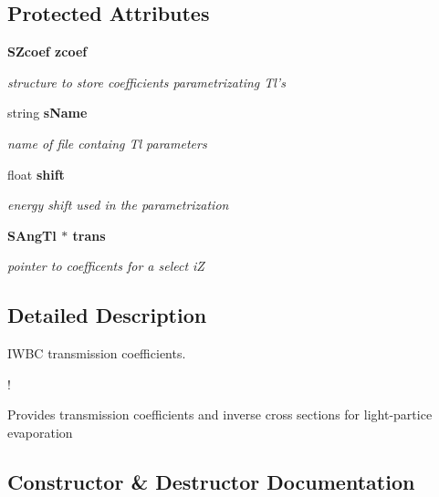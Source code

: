 \subsection*{Protected Attributes}
\begin{CompactItemize}
\item 
\bf{SZcoef} \bf{zcoef}\label{classCTlArray_5028ad63ebf842107ed442c414510abc}

\begin{CompactList}\small\item\em structure to store coefficients parametrizating Tl's \item\end{CompactList}\item 
string \bf{s\-Name}\label{classCTlArray_34cd39424a5bd64bd88c143d051e1ceb}

\begin{CompactList}\small\item\em name of file containg Tl parameters \item\end{CompactList}\item 
float \bf{shift}\label{classCTlArray_81585d8de22b732d853064f63d1105f2}

\begin{CompactList}\small\item\em energy shift used in the parametrization \item\end{CompactList}\item 
\bf{SAng\-Tl} $\ast$ \bf{trans}\label{classCTlArray_c052b5a65a2c6701f1bc7ad3a383a24b}

\begin{CompactList}\small\item\em pointer to coefficents for a select i\-Z \item\end{CompactList}\end{CompactItemize}


\subsection{Detailed Description}
IWBC transmission coefficients. 

!

Provides transmission coefficients and inverse cross sections for light-partice evaporation 



\subsection{Constructor \& Destructor Documentation}
